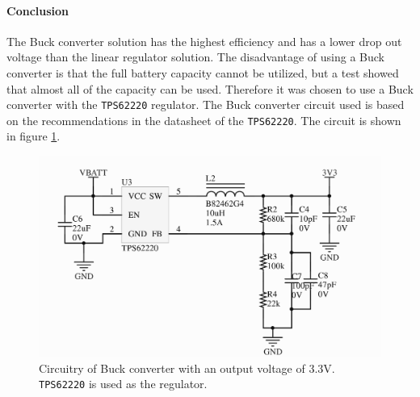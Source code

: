 \paragraph{Conclusion}
The Buck converter solution has the highest efficiency and has a lower drop out voltage than the linear regulator solution.
The disadvantage of using a Buck converter is that the full battery capacity cannot be utilized, but a test showed that almost all of the capacity can be used.
Therefore it was chosen to use a Buck converter with the \texttt{TPS62220} regulator. 
The Buck converter circuit used is based on the recommendations in the datasheet of the \texttt{TPS62220}.
The circuit is shown in figure \ref{fig:tps62220_circuit}.

\begin{figure}[h]
	\centering
    \includegraphics[width=.8\linewidth]{graphics/tps6220_circuit}
	\caption{Circuitry of Buck converter with an output voltage of 3.3V. \texttt{TPS62220} is used as the regulator.}
	\label{fig:tps62220_circuit}
\end{figure}
